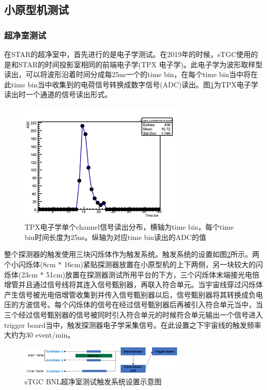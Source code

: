 \subsection{小原型机测试}

\subsubsection{超净室测试}

在STAR的超净室中，首先进行的是电子学测试。在2019年的时候，sTGC使用的是和STAR的时间投影室相同的前端电子学(TPX 电子学)。此电子学为波形取样型读出，可以将波形沿着时间分成每25ns一个的time bin，在每个time bin当中将在此time bin当中收集到的电荷信号转换成数字信号(ADC)读出。图\ref{fig:TPXChannel}为TPX电子学读出时一个通道的信号读出形式。
\begin{figure}[htb]
    \begin{center}
    \includegraphics[width=0.7\textwidth,clip]{figures/Chapter3/TPXChannel.png}
    \end{center}
    \caption[TPX电子学单个channel信号读出分布]{TPX电子学单个channel信号读出分布，横轴为time bin，每个time bin时间长度为25ns。纵轴为对应time bin读出的ADC的值}
    \label{fig:TPXChannel}
\end{figure}
整个探测器的触发使用三块闪烁体作为触发系统。触发系统的设置如图\ref{fig:sTGC_Trigger_CR}所示。两个小闪烁体(8cm $*$ 16cm)紧贴探测器放置在小原型机的上下两侧，另一块较大的闪烁体(23cm $*$ 51cm)放置在探测器测试所用平台的下方，三个闪烁体末端接光电倍增管并且通过信号线将其连入信号甄别器，再联入符合单元。当宇宙线穿过闪烁体产生信号被光电倍增管收集到并传入信号甄别器以后，信号甄别器将其转换成负电压的方波信号。每个闪烁体的信号在经过信号甄别器后再被引入符合单元当中，当三个经过信号甄别器的信号被同时引入符合单元的时候符合单元输出一个信号进入trigger board当中，触发探测器电子学采集信号。在此设置之下宇宙线的触发频率大约为30 event/min。
\begin{figure}[htb]
    \begin{center}
    \includegraphics[width=0.7\textwidth,clip]{figures/Chapter3/TiggerCarton.png}
    \end{center}
    \caption[sTGC BNL超净室测试触发系统设置示意图]{sTGC BNL超净室测试触发系统设置示意图}
    \label{fig:sTGC_Trigger_CR}
\end{figure}

